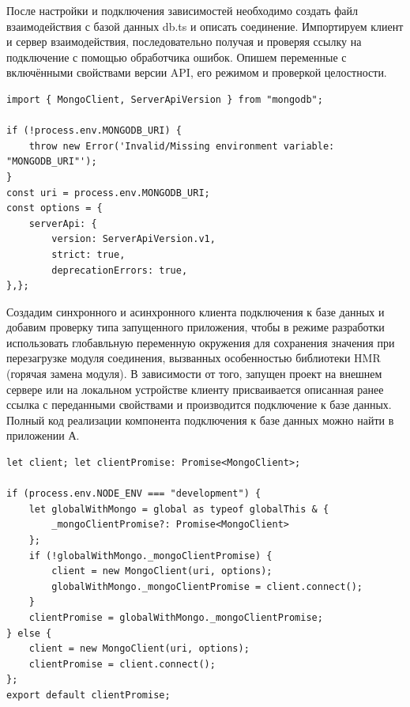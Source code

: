 \documentclass[master, och, diploma]{SCWorks}
\begin{document}
После настройки и подключения зависимостей необходимо создать файл взаимодействия с базой данных db.ts и описать соединение. Импортируем клиент и сервер взаимодействия, последовательно получая и проверяя ссылку на подключение с помощью обработчика ошибок. Опишем переменные с включёнными свойствами версии API, его режимом и проверкой целостности.
\begin{verbatim}
import { MongoClient, ServerApiVersion } from "mongodb";

if (!process.env.MONGODB_URI) {
    throw new Error('Invalid/Missing environment variable: "MONGODB_URI"');
}
const uri = process.env.MONGODB_URI;
const options = {
    serverApi: {
        version: ServerApiVersion.v1,
        strict: true,
        deprecationErrors: true,
},};
\end{verbatim}

Создадим синхронного и асинхронного клиента подключения к базе данных и добавим проверку типа запущенного приложения, чтобы в режиме разработки использовать глобавльную переменную окружения для сохранения значения при перезагрузке модуля соединения, вызванных особенностью библиотеки HMR (горячая замена модуля). В зависимости от того, запущен проект на внешнем сервере или на локальном устройстве клиенту присваивается описанная ранее ссылка с переданными свойствами и производится подключение к базе данных. Полный код реализации компонента подключения к базе данных можно найти в приложении А.
\begin{verbatim}
let client; let clientPromise: Promise<MongoClient>;
 
if (process.env.NODE_ENV === "development") {
    let globalWithMongo = global as typeof globalThis & {
        _mongoClientPromise?: Promise<MongoClient>
    };
    if (!globalWithMongo._mongoClientPromise) {
        client = new MongoClient(uri, options);
        globalWithMongo._mongoClientPromise = client.connect();
    }
    clientPromise = globalWithMongo._mongoClientPromise;
} else {
    client = new MongoClient(uri, options);
    clientPromise = client.connect();
};
export default clientPromise;
\end{verbatim}
\end{document}
